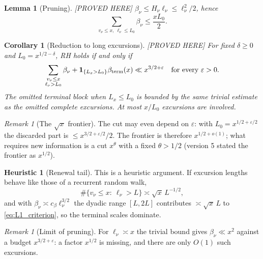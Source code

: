 \documentclass[11pt]{amsart}
\numberwithin{equation}{section}
\theoremstyle{plain}
\newtheorem{lemma}[theorem]{Lemma}
\newtheorem{corollary}[theorem]{Corollary}
\theoremstyle{definition}
\newtheorem{heuristic}[theorem]{Heuristic}
\theoremstyle{remark}
\newtheorem{remark}[theorem]{Remark}
\newcommand{\eps}{\varepsilon}
\begin{document}
\begin{lemma}[Pruning]
\label{lem:pruning}
\emph{[PROVED HERE]} $\beta_\nu\le H_\nu\ell_\nu\le\ell_\nu^2/2$, hence
\begin{equation}
\label{eq:pruning}
  \sum_{v_\nu\le x,\ \ell_\nu\le L_0}\beta_\nu\le\frac{xL_0}{2}.
\end{equation}
\end{lemma}

\begin{corollary}[Reduction to long excursions]
\label{cor:long}
\emph{[PROVED HERE]} For fixed $\delta\ge0$ and $L_0=x^{1/2-\delta}$, RH
holds if and only if
\begin{equation}
\label{eq:long_reduction}
  \sum_{\substack{v_\nu\le x\\ \ell_\nu>L_0}}\beta_\nu
  +\mathbf 1_{\{L_x>L_0\}}\beta_{\rm term}(x)\ll x^{3/2+\eps}
  \quad\text{for every }\eps>0.
\end{equation}
The omitted terminal block when $L_x\le L_0$ is bounded by the same trivial
estimate as the omitted complete excursions. At most
$x/L_0$ excursions are involved.
\end{corollary}

\begin{remark}[The $\sqrt{x}$ frontier]
\label{rem:sqrt_frontier}
The cut may even depend on $\eps$: with $L_0=x^{1/2+\eps/2}$ the discarded
part is $\le x^{3/2+\eps/2}/2$. The frontier is therefore $x^{1/2+o(1)}$;
what requires new information is a cut $x^{\theta}$ with a fixed
$\theta>1/2$ (version 5 stated the frontier as $x^{1/2}$).
\end{remark}

\begin{heuristic}[Renewal tail]
\label{heu:renewal}
This is a heuristic argument. If excursion lengths behave like those of a
recurrent random walk,
\begin{equation}
\label{eq:renewal_tail}
  \#\{v_\nu\le x:\ \ell_\nu>L\}\asymp\sqrt{x}\,L^{-1/2},
\end{equation}
and with $\beta_\nu\asymp c_\beta\ell_\nu^{3/2}$ the dyadic range
$[L,2L]$ contributes $\asymp\sqrt{x}\,L$ to \eqref{eq:L1_criterion}, so the
terminal scales dominate.
\end{heuristic}

\begin{remark}[Limit of pruning]
\label{rem:pruning_limit}
For $\ell_\nu\asymp x$ the trivial bound gives $\beta_\nu\ll x^2$ against a
budget $x^{3/2+\eps}$: a factor $x^{1/2}$ is missing, and there are only
$O(1)$ such excursions.
\end{remark}
\end{document}

